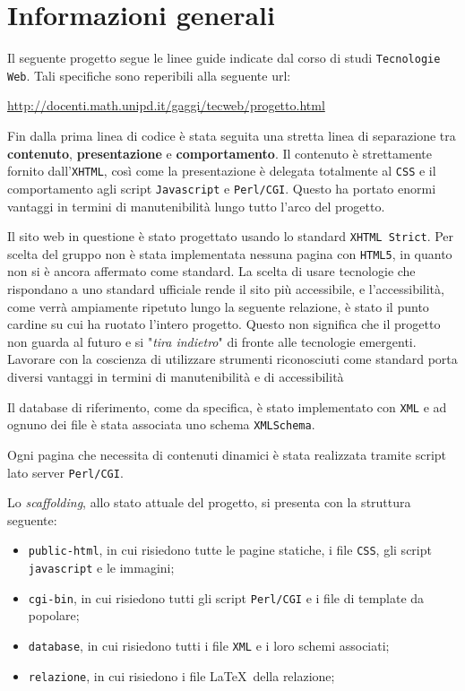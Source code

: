 \section{Informazioni generali}

Il seguente progetto segue le linee guide indicate dal corso di studi \texttt{Tecnologie Web}. Tali specifiche sono reperibili alla seguente url:

\begin{center}
	\url{http://docenti.math.unipd.it/gaggi/tecweb/progetto.html}
\end{center}

Fin dalla prima linea di codice è stata seguita una stretta linea di separazione tra \textbf{contenuto}, \textbf{presentazione} e \textbf{comportamento}. Il contenuto è strettamente fornito dall'\texttt{XHTML}, così come la presentazione è delegata totalmente al \texttt{CSS} e il comportamento agli script \texttt{Javascript} e \texttt{Perl/CGI}. Questo ha portato enormi vantaggi in termini di manutenibilità lungo tutto l'arco del progetto.

Il sito web in questione è stato progettato usando lo standard \texttt{XHTML Strict}. Per scelta del gruppo non è stata implementata nessuna pagina con \texttt{HTML5}, in quanto non si è ancora affermato come standard. La scelta di usare tecnologie che rispondano a uno standard ufficiale rende il sito più accessibile, e l'accessibilità, come verrà ampiamente ripetuto lungo la seguente relazione, è stato il punto cardine su cui ha ruotato l'intero progetto. Questo non significa che il progetto non guarda al futuro e si "\textit{tira indietro}" di fronte alle tecnologie emergenti. Lavorare con la coscienza di utilizzare strumenti riconosciuti come standard porta diversi vantaggi in termini di manutenibilità e di accessibilità

Il database di riferimento, come da specifica, è stato implementato con \texttt{XML} e ad ognuno dei file è stata associata uno schema \texttt{XMLSchema}.

Ogni pagina che necessita di contenuti dinamici è stata realizzata tramite script lato server \texttt{Perl/CGI}.

Lo \textit{scaffolding}, allo stato attuale del progetto, si presenta con la struttura seguente:

\begin{itemize}

	\item \texttt{public-html}, in cui risiedono tutte le pagine statiche, i file \texttt{CSS}, gli script \texttt{javascript} e le immagini;
	\item \texttt{cgi-bin}, in cui risiedono tutti gli script \texttt{Perl/CGI} e i file di template da popolare;
	\item \texttt{database}, in cui risiedono tutti i file \texttt{XML} e i loro schemi associati;
	\item \texttt{relazione}, in cui risiedono i file \LaTeX\ della relazione;

\end{itemize}